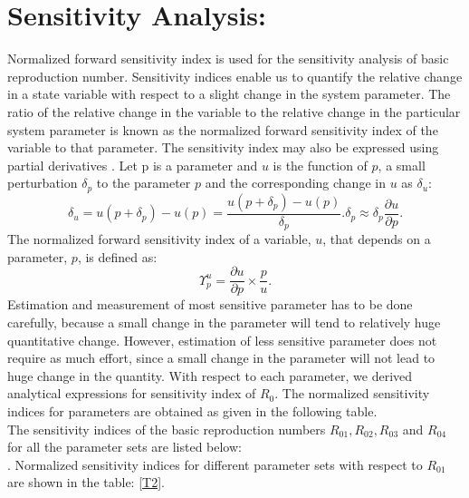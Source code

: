 \section{Sensitivity Analysis:}
Normalized forward sensitivity index is used for the sensitivity analysis of basic reproduction number. Sensitivity indices enable us to quantify the relative change in a state variable with respect to a slight change in the system parameter.
The ratio of the relative change in the variable to the relative change in the particular system parameter is known as the normalized forward sensitivity index of the variable to that parameter. The sensitivity index may also be expressed using partial derivatives \citep{chitnis2008determining}. Let p is a parameter and $u$ is the function of $p$, a small perturbation $\delta_p$ to the parameter $p$ and the corresponding change in $u$ as $\delta_u$:
\[
\delta_u = u(p+\delta_p) - u(p)=\frac{u(p+\delta_p) - u(p)}{\delta_p}.\delta_p \approx \delta_p\frac{\partial u}{\partial p}.
\]
The normalized forward sensitivity index of a variable, $u$, that depends on a parameter, $p$, is defined as:
\[
 \varUpsilon^u_p = \frac{\partial u}{\partial p} \times \frac{p}{u}.
\]
Estimation and measurement of most sensitive parameter has to be done carefully, because a small change in the parameter will tend to relatively huge quantitative change. However, estimation of less sensitive parameter does not require as much effort,
since a small change in the parameter will not lead to huge change in the quantity.
With respect to each parameter, we derived analytical expressions for sensitivity index of $R_{0}$. The normalized
sensitivity indices for parameters are obtained as given in the following table.\\
\noindent The sensitivity indices of the basic reproduction numbers $R_{01}, R_{02}, R_{03}$ and  $R_{04}$
for all the parameter sets are listed below:\\
\newpage
{}. Normalized sensitivity indices for different parameter sets with respect to $R_{01}$  are shown in the table: \ref{T2}.\\
